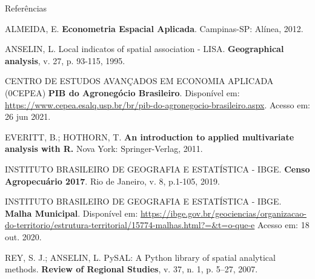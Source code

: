 \documentclass[aspectratio=169]{beamer}
\begin{document}
\begin{frame}{Referências}
	\begin{flushleft}
			\footnotesize{  

				{ALMEIDA, E. \textbf{Econometria Espacial Aplicada}. Campinas-SP: Alínea, 2012.}
				
				\vspace{0.2cm}
					
				{ANSELIN, L. Local indicatos of spatial association - LISA. \textbf{Geographical analysis}, v. 27, p. 93-115, 1995.}	

				\vspace{0.2cm}
				
				{CENTRO DE ESTUDOS AVANÇADOS EM ECONOMIA APLICADA (0CEPEA) \textbf{PIB do Agronegócio Brasileiro}. Disponível em: \url{https://www.cepea.esalq.usp.br/br/pib-do-agronegocio-brasileiro.aspx}. Acesso em: 26 jun 2021.}
				
				\vspace{0.2cm}
				
				{EVERITT, B.; HOTHORN, T. \textbf{An introduction to applied multivariate analysis with R.} Nova York: Springer-Verlag, 2011.}
				
				\vspace{0.2cm}
				
                {INSTITUTO BRASILEIRO DE GEOGRAFIA E ESTATÍSTICA - IBGE. \textbf{Censo Agropecuário 2017}. Rio de Janeiro, v. 8, p.1-105, 2019.}
                
                \vspace{0.2cm}
                
                {INSTITUTO BRASILEIRO DE GEOGRAFIA E ESTATÍSTICA - IBGE. \textbf{Malha Municipal}.  Disponível em: \url{https://ibge.gov.br/geociencias/organizacao-do-territorio/estrutura-territorial/15774-malhas.html?=&t=o-que-e} Acesso em: 18 out. 2020.}

				\vspace{0.2cm}
				
		    	{REY, S. J.; ANSELIN, L. PySAL: A Python library of spatial analytical methods.\textbf{ Review of Regional Studies}, v. 37, n. 1, p. 5–27, 2007.}
		    }
	\end{flushleft}
\end{frame}
\end{document}
